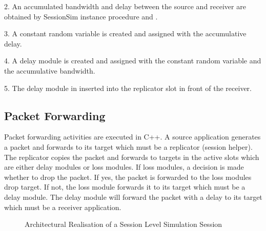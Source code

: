 2. An accumulated bandwidth and delay between the source and receiver are obtained by SessionSim instance procedure  and .

3. A constant random variable is created and assigned with the
accumulative delay.

4. A delay module is created and assigned with the constant random 
variable and the accumulative bandwidth.

5. The delay module in inserted into the replicator slot in
front of the receiver.



\subsection{Packet Forwarding}
\label{sec:session-pktforward}
Packet forwarding activities are executed in C++.  A source application 
generates a packet and forwards to its target which must be a replicator 
(session helper).  The replicator copies the packet and forwards 
to targets in the active slots which are either delay modules or loss modules. If loss modules, a decision is made whether to drop the packet.
If yes, the packet is forwarded to the loss modules drop target.  If not,
the loss module forwards it to its target which must be a delay module.
The delay module will forward the packet with a delay to its target which
must be a receiver application.
\begin{figure}[tb]
  \caption{Architectural Realisation of a Session Level Simulation Session}
  \label{fig:session}
\end{figure}

\endinput

### Local Variables:
### mode: latex
### comment-column: 60
### backup-by-copying-when-linked: t
### file-precious-flag: nil
### End:
